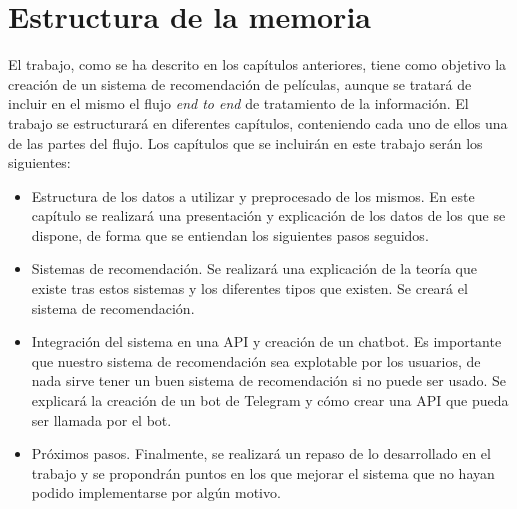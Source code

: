 \section{Estructura de la memoria}\label{sec:estructura}

El trabajo, como se ha descrito en los capítulos anteriores, tiene como objetivo la creación de un sistema de recomendación de películas, aunque se tratará de incluir en el mismo el flujo \textit{end to end} de tratamiento de la información. El trabajo se estructurará en diferentes capítulos, conteniendo cada uno de ellos una de las partes del flujo. Los capítulos que se incluirán en este trabajo serán los siguientes:

\begin{itemize}
    \item Estructura de los datos a utilizar y preprocesado de los mismos. En este capítulo se realizará una presentación y explicación de los datos de los que se dispone, de forma que se entiendan los siguientes pasos seguidos.
    \item Sistemas de recomendación. Se realizará una explicación de la teoría que existe tras estos sistemas y los diferentes tipos que existen. Se creará el sistema de recomendación.
    \item Integración del sistema en una API y creación de un chatbot. Es importante que nuestro sistema de recomendación sea explotable por los usuarios, de nada sirve tener un buen sistema de recomendación si no puede ser usado. Se explicará la creación de un bot de Telegram y cómo crear una API que pueda ser llamada por el bot.
    \item Próximos pasos. Finalmente, se realizará un repaso de lo desarrollado en el trabajo y se propondrán puntos en los que mejorar el sistema que no hayan podido implementarse por algún motivo.
\end{itemize}

    
